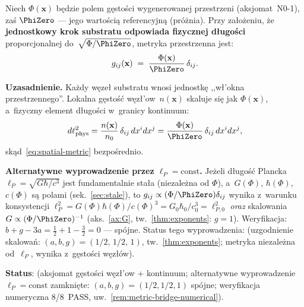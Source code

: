 \begin{proposition}%
\label{prop:spatial-metric-from-substrate}
Niech $\Phi(\mathbf{x})$ b\k{e}dzie polem g\k{e}sto\'sci wygenerowanej
przestrzeni (aksjomat~N0-1), za\'s $\PhiZero$ --- jego warto\'sci\k{a}
referencyjn\k{a} (pr\'o\.znia).
Przy za\l{}o\.zeniu, \.ze \textbf{jednostkowy krok substratu odpowiada
fizycznej d\l{}ugo\'sci} proporcjonalnej do~$\sqrt{\Phi/\PhiZero}$,
metryka przestrzenna jest:
\begin{equation}\label{eq:spatial-metric}
  g_{ij}(\mathbf{x}) \;=\; \frac{\Phi(\mathbf{x})}{\PhiZero}\,\delta_{ij}.
\end{equation}

\medskip\noindent
\textbf{Uzasadnienie.}
Ka\.zdy w\k{e}ze\l{} substratu wnosi jednostk\k{e} ,,w\l{}'okna
przestrzennego''. Lokalna g\k{e}sto\'s\'c w\k{e}z\l{}'ow~$n(\mathbf{x})$
skaluje si\k{e} jak $\Phi(\mathbf{x})$, a~fizyczny element
d\l{}ugo\'sci w~granicy kontinuum:
\begin{equation}
  d\ell^2_{\rm phys}
  = \frac{n(\mathbf{x})}{n_0}\,\delta_{ij}\,dx^i dx^j
  = \frac{\Phi(\mathbf{x})}{\PhiZero}\,\delta_{ij}\,dx^i dx^j,
\end{equation}
sk\k{a}d~\eqref{eq:spatial-metric} bezpo\'srednio.

\medskip\noindent
\textbf{Alternatywne wyprowadzenie przez $\ell_P = \text{const}$.}
Je\.zeli d\l{}ugo\'s\'c Plancka $\ell_P = \sqrt{G\hbar/c^3}$ jest
fundamentalnie sta\l{}a (niezale\.zna od $\Phi$), a~$G(\Phi)$,
$\hbar(\Phi)$, $c(\Phi)$ s\k{a} polami (sek.~\ref{sec:stale}), to
$g_{ij} \propto (\Phi/\PhiZero)\delta_{ij}$
wynika z~warunku konsystencji
$\ell_P^2 = G(\Phi)\hbar(\Phi)/c(\Phi)^3 = G_0\hbar_0/c_0^3 = \ell_{P,0}^2$
\emph{oraz} skalowania $G \propto (\Phi/\PhiZero)^{-1}$
(aks.~\ref{ax:G}, tw.~\ref{thm:exponents}: $g = 1$).
Weryfikacja:
$b + g - 3a = \tfrac{1}{2} + 1 - \tfrac{3}{2} = 0$ --- sp\'ojne.
Status tego wyprowadzenia: 
(uzgodnienie skalowa\'n: $(a,b,g) = (1/2,\,1/2,\,1)$,
tw.~\ref{thm:exponents}; metryka niezale\.zna od~$\ell_P$,
wynika z~g\k{e}sto\'sci w\k{e}z\l{}\'ow).

\medskip\noindent
\textbf{Status}:  (aksjomat g\k{e}sto\'sci w\k{e}z\l{}'ow
+ kontinuum; alternatywne wyprowadzenie $\ell_P{=}\mathrm{const}$
zamkni\k{e}te: $(a,b,g){=}(1/2,1/2,1)$ sp\'ojne;
weryfikacja numeryczna 8/8~PASS,
uw.~\ref{rem:metric-bridge-numerical}).
\end{proposition}

